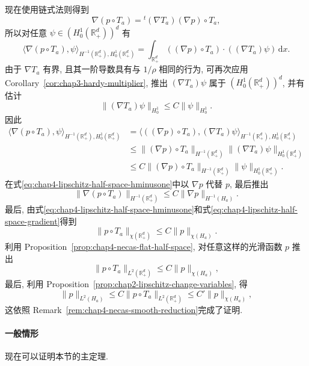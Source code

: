 \begin{Proof}
现在使用链式法则得到
\[
 \nabla(p\circ T_a)={}^{t}(\nabla T_a)(\nabla p)\circ T_a,
\]
所以对任意 $\psi\in(H_0^1(\mathbb R_+^d))^d$ 有
\[
 \langle\nabla(p\circ T_a),\psi\rangle_{H^{-1}(\mathbb R_+^d),H_0^1(\mathbb R_+^d)}
 =\int_{\mathbb R_+^d}((\nabla p)\circ T_a)\cdot((\nabla T_a)\psi)\,\mathrm dx.
\]
由于 $\nabla T_a$ 有界, 且其一阶导数具有与 $1/\rho$ 相同的行为, 可再次应用 Corollary~\ref{cor:chap3-hardy-multiplier}, 推出 $(\nabla T_a)\psi$ 属于 $(H_0^1(\mathbb R_+^d))^d$, 并有估计
\[
 \|(\nabla T_a)\psi\|_{H_0^1}
 \leq C\|\psi\|_{H_0^1}.
\]
因此
\[
\begin{aligned}
 \langle\nabla(p\circ T_a),\psi\rangle_{H^{-1}(\mathbb R_+^d),H_0^1(\mathbb R_+^d)}
 &=\langle((\nabla p)\circ T_a),(\nabla T_a)\psi\rangle_{H^{-1}(\mathbb R_+^d),H_0^1(\mathbb R_+^d)}\\
 &\leq\|(\nabla p)\circ T_a\|_{H^{-1}(\mathbb R_+^d)}
 \|(\nabla T_a)\psi\|_{H_0^1(\mathbb R_+^d)}\\
 &\leq C\|(\nabla p)\circ T_a\|_{H^{-1}(\mathbb R_+^d)}
 \|\psi\|_{H_0^1(\mathbb R_+^d)}.
\end{aligned}
\]
在式\eqref{eq:chap4-lipschitz-half-space-hminusone}中以 $\nabla p$ 代替 $p$, 最后推出
\begin{equation}
 \|\nabla(p\circ T_a)\|_{H^{-1}(\mathbb R_+^d)}
 \leq C\|\nabla p\|_{H^{-1}(H_a)}.
 \label{eq:chap4-lipschitz-half-space-gradient}
\end{equation}
最后, 由式\eqref{eq:chap4-lipschitz-half-space-hminusone}和式\eqref{eq:chap4-lipschitz-half-space-gradient}得到
\[
 \|p\circ T_a\|_{\chi(\mathbb R_+^d)}
 \leq C\|p\|_{\chi(H_a)}.
\]
利用 Proposition~\ref{prop:chap4-necas-flat-half-space}, 对任意这样的光滑函数 $p$ 推出
\[
 \|p\circ T_a\|_{L^2(\mathbb R_+^d)}
 \leq C\|p\|_{\chi(H_a)},
\]
最后, 利用 Proposition~\ref{prop:chap2-lipschitz-change-variables}, 得
\[
 \|p\|_{L^2(H_a)}
 \leq C\|p\circ T_a\|_{L^2(\mathbb R_+^d)}
 \leq C'\|p\|_{\chi(H_a)},
\]
这依照 Remark~\ref{rem:chap4-necas-smooth-reduction}完成了证明.
\end{Proof}

\paragraph{一般情形}
\label{subsec:chap4-necas-general-domain}

现在可以证明本节的主定理.

